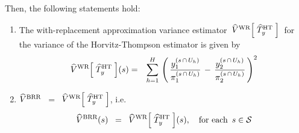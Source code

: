 \begin{proposition}
\begin{itemize}
\begin{equation*}
	\end{equation*}
\end{itemize}
Then, the following statements hold:
\begin{enumerate}
\item
	The with-replacement approximation variance estimator 
	\,$\widehat{V}^{\textnormal{WR}}\!\left[\;\widehat{T}^{\textnormal{HT}}_{y}\;\right]$\,
	for the variance of the Horvitz-Thompson estimator is given by
	\begin{eqnarray*}
	\widehat{V}^{\textnormal{WR}}\!\left[\;\widehat{T}^{\textnormal{HT}}_{y}\;\right]\!(s)
	& = &
		\overset{H}{\underset{h = 1}{\sum}}\,
		\left(\,
			\dfrac{y^{(s\,\cap\,U_{h})}_{1}}{\pi^{(s\,\cap\,U_{h})}_{1}}
			\,-\,
			\dfrac{y^{(s\,\cap\,U_{h})}_{2}}{\pi^{(s\,\cap\,U_{h})}_{2}}
			\,\right)^{2}
	\end{eqnarray*}
\item
	$\widehat{V}^{\textnormal{BRR}}$ \,$=$\,
	$\widehat{V}^{\textnormal{WR}}\!\left[\;\widehat{T}^{\textnormal{HT}}_{y}\;\right]$, i.e.
	\begin{equation*}
	\widehat{V}^{\textnormal{BRR}}(s)
	\;\; = \;\;
		\widehat{V}^{\textnormal{WR}}\!\left[\;\widehat{T}^{\textnormal{HT}}_{y}\;\right]\!(s),
	\quad
	\textnormal{for each \,$s \in \mathcal{S}$}
	\end{equation*}
\end{enumerate}
\end{proposition}
\proof
